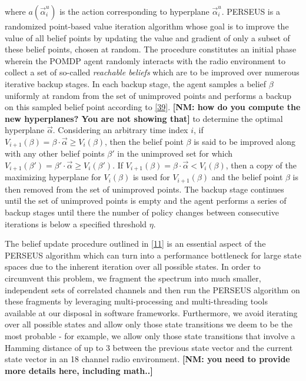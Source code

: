\documentclass[10pt,twocolumn]{IEEEtran}
\newcommand{\nm}[1]{{\color{blue}\bf{[NM: #1]}}}
\newcommand{\bk}[1]{{\color{magenta}{[BK: #1]}}}
\begin{document}
where $a(\vec{\alpha}_i^{u})$ is the action corresponding to hyperplane $\vec{\alpha}_i^{u}$. PERSEUS is a randomized point-based value iteration algorithm whose goal is to improve the value of all belief points by updating the value and gradient of only a subset of these belief points, chosen at random. The procedure constitutes an initial phase wherein the POMDP agent randomly interacts with the radio environment to collect a set of so-called \emph{reachable beliefs} which are to be improved over numerous iterative backup stages. In each backup stage, the agent samples a belief $\beta$ uniformly at random from the set of unimproved points and performs a backup on this sampled belief point according to \eqref{39}. \nm{how do you compute the new hyperplanes? You are not showing that} \bk{Isn't that given by \eqref{39}? What other details should I add?} to determine the optimal hyperplane $\vec{\alpha}$. Considering an arbitrary time index $i$, if $V_{i+1}(\beta) = \beta \cdot \vec{\alpha} \geq V_{i}(\beta)$, then the belief point $\beta$ is said to be improved along with any other belief points $\beta'$ in the unimproved set for which $V_{i+1}(\beta') = \beta' \cdot \vec{\alpha} \geq V_{i}(\beta')$. If $V_{i+1}(\beta) = \beta \cdot \vec{\alpha} < V_{i}(\beta)$, then a copy of the maximizing hyperplane for $V_i(\beta)$ is used for $V_{i+1}(\beta)$ and the belief point $\beta$ is then removed from the set of unimproved points. The backup stage continues until the set of unimproved points is empty and the agent performs a series of backup stages until there the number of policy changes between consecutive iterations is below a specified threshold $\eta$.

The belief update procedure outlined in \eqref{11} is an essential aspect of the PERSEUS algorithm which can turn into a performance bottleneck for large state spaces due to the inherent iteration over all possible states. In order to circumvent this problem, we fragment the spectrum into much smaller, independent sets of correlated channels and then run the PERSEUS algorithm on these fragments by leveraging multi-processing and multi-threading tools available at our disposal in software frameworks. Furthermore, we avoid iterating over all possible states and allow only those state transitions we deem to be the most probable - for example, we allow only those state transitions that involve a Hamming distance of up to 3 between the previous state vector and the current state vector in an 18 channel radio environment. \nm{ you need to provide more details here, including math..} \bk{Do you mean more details about PERSEUS in general or more details about my modifications to PERSEUS (fragmentation and belief simplification)?}
\end{document}

